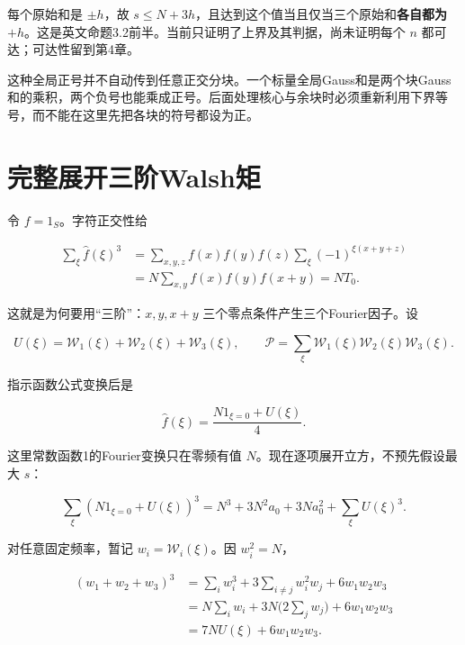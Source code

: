 \documentclass[UTF8,fontset=fandol,zihao=-4,openany,oneside]{ctexbook}
\begin{document}
每个原始和是 \(\pm h\)，故 \(s\le N+3h\)，且达到这个值当且仅当三个原始和\textbf{各自都为 \(+h\)}。这是英文命题3.2前半。当前只证明了上界及其判据，尚未证明每个 \(n\) 都可达；可达性留到第4章。



这种全局正号并不自动传到任意正交分块。一个标量全局Gauss和是两个块Gauss和的乘积，两个负号也能乘成正号。后面处理核心与余块时必须重新利用下界等号，而不能在这里先把各块的符号都设为正。



\section{完整展开三阶Walsh矩}


令 \(f=1_S\)。字符正交性给



\[
\begin{aligned}
\sum_\xi\widehat f(\xi)^3
&=\sum_{x,y,z}f(x)f(y)f(z)
  \sum_\xi(-1)^{\xi(x+y+z)}\\
&=N\sum_{x,y}f(x)f(y)f(x+y)=NT_0.
\end{aligned}
\]



这就是为何要用“三阶”：\(x,y,x+y\) 三个零点条件产生三个Fourier因子。设



\[
U(\xi)=\mathcal W_1(\xi)+\mathcal W_2(\xi)+\mathcal W_3(\xi),\qquad
\mathcal P=\sum_\xi\mathcal W_1(\xi)\mathcal W_2(\xi)\mathcal W_3(\xi).
\]



指示函数公式变换后是



\[
\widehat f(\xi)=\frac{N1_{\xi=0}+U(\xi)}4.
\]



这里常数函数1的Fourier变换只在零频有值 \(N\)。现在逐项展开立方，不预先假设最大 \(s\)：



\[
\sum_\xi(N1_{\xi=0}+U(\xi))^3
=N^3+3N^2a_0+3Na_0^2+\sum_\xi U(\xi)^3.
\]



对任意固定频率，暂记 \(w_i=\mathcal W_i(\xi)\)。因 \(w_i^2=N\)，



\[
\begin{aligned}
(w_1+w_2+w_3)^3
&=\sum_iw_i^3+3\sum_{i\ne j}w_i^2w_j+6w_1w_2w_3\\
&=N\sum_iw_i+3N\bigl(2\sum_jw_j\bigr)+6w_1w_2w_3\\
&=7NU(\xi)+6w_1w_2w_3.
\end{aligned}
\]
\end{document}
